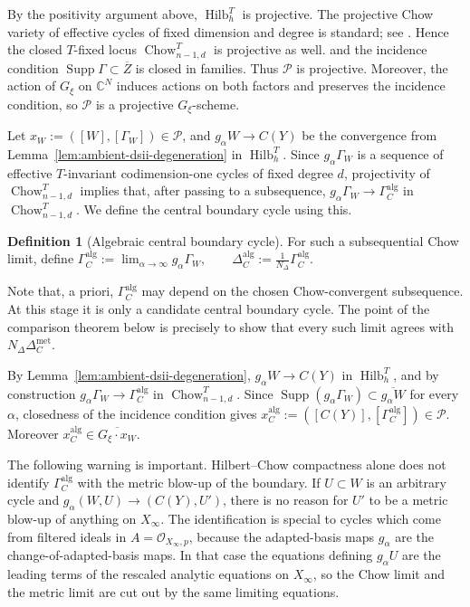 \documentclass[11pt]{amsart}
\theoremstyle{definition}
\newtheorem{definition}[theorem]{Definition}
\theoremstyle{remark}
\begin{document}
By the positivity argument above, $\operatorname{Hilb}_h^T$ is projective.
The projective Chow variety of effective cycles of fixed dimension and degree is
standard; see \cite[Chapter~I]{KollarRationalCurves}. Hence the closed
$T$-fixed locus $\operatorname{Chow}_{n-1,d}^T$ is projective as well.
and the incidence condition
$\operatorname{Supp}\Gamma\subset\overline Z$
is closed in families. Thus $\mathcal{P}$ is projective. Moreover, the action of $G_\xi$ on $\mathbb C^N$ induces
actions on both factors and preserves the incidence condition, so
$\mathcal P$ is a projective $G_\xi$-scheme.

Let $x_W:=([W],[\Gamma_W])\in \mathcal P$, and $g_\alpha W\to C(Y)$ be the convergence from Lemma~\ref{lem:ambient-dsii-degeneration} in $\operatorname{Hilb}_h^T$. Since $g_\alpha\Gamma_W$ is a sequence of effective $T$-invariant codimension-one cycles of fixed degree $d$, projectivity of
$\operatorname{Chow}_{n-1,d}^T$ implies that, after passing to a subsequence, $g_\alpha\Gamma_W\longrightarrow \Gamma_C^{\mathrm{alg}}$
in $\operatorname{Chow}_{n-1,d}^T$. We define the central boundary cycle using this. 

\begin{definition}[Algebraic central boundary cycle]
For such a subsequential Chow limit, define $\Gamma_C^{\mathrm{alg}}
    :=
    \lim_{\alpha\to\infty}g_\alpha\Gamma_W,
    \qquad
    \Delta_C^{\mathrm{alg}}
    :=
    \frac{1}{N_\Delta}\Gamma_C^{\mathrm{alg}}.
$
\end{definition}


Note that, a priori, $\Gamma_C^{\mathrm{alg}}$ may depend on the chosen
Chow-convergent subsequence. At this stage it is only a candidate central
boundary cycle. The point of the comparison theorem below is precisely to show
that every such limit agrees with $N_\Delta\Delta_C^{\mathrm{met}}$.

By Lemma~\ref{lem:ambient-dsii-degeneration}, $g_\alpha W\to C(Y)$ in
$\operatorname{Hilb}_h^T$, and by construction
$g_\alpha\Gamma_W\to \Gamma_C^{\mathrm{alg}}$ in
$\operatorname{Chow}_{n-1,d}^T$. Since
$\operatorname{Supp}(g_\alpha\Gamma_W)\subset \overline{g_\alpha W}$ for every
$\alpha$, closedness of the incidence condition gives
$x_C^{\mathrm{alg}}:=([C(Y)],[\Gamma_C^{\mathrm{alg}}])\in\mathcal P$.
Moreover $x_C^{\mathrm{alg}}\in\overline{G_\xi\cdot x_W}$.

The following warning is important. Hilbert--Chow compactness alone does not
identify $\Gamma_C^{\mathrm{alg}}$ with the metric blow-up of the boundary. If
$U\subset W$ is an arbitrary cycle and $g_\alpha(W,U)\to(C(Y),U')$, there is no
reason for $U'$ to be a metric blow-up of anything on $X_\infty$. The
identification is special to cycles which come from filtered ideals in
$A=\mathcal O_{X_\infty,p}$, because the adapted-basis maps $g_\alpha$ are the
change-of-adapted-basis maps. In that case the equations defining
$g_\alpha U$ are the leading terms of the rescaled analytic equations on
$X_\infty$, so the Chow limit and the metric limit are cut out by the same
limiting equations.
\end{document}
